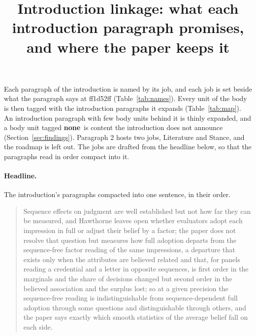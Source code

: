 \documentclass[11pt,a4paper]{article}
\title{Introduction linkage: what each introduction paragraph promises,\\ and where the paper keeps it}
\author{}
\date{}
\newcommand{\none}{\textbf{none}}
\begin{document}
\maketitle

\noindent Each paragraph of the introduction is named by its job, and each job is set beside
what the paragraph says at ff1d52ff (Table~\ref{tab:names}). Every unit of the body is then
tagged with the introduction paragraphs it expands (Table~\ref{tab:map}). An introduction
paragraph with few body units behind it is thinly expanded, and a body unit tagged \none\ is
content the introduction does not announce (Section~\ref{sec:findings}). Paragraph 2 hosts two
jobs, Literature and Stance, and the roadmap is left out. The jobs are drafted from the headline
below, so that the paragraphs read in order compact into it.

\paragraph{Headline.} The introduction's paragraphs compacted into one sentence, in their order.
\begin{quote}
Sequence effects on judgment are well established but not how far they can be measured, and
Hawthorne leaves open whether evaluators adopt each impression in full or adjust their belief by
a factor; the paper does not resolve that question but measures how full adoption departs from
the sequence-free factor reading of the same impressions, a departure that exists only when the
attributes are believed related and that, for panels reading a credential and a letter in
opposite sequences, is first order in the marginals and the share of decisions changed but
second order in the believed association and the surplus lost; so at a given precision the
sequence-free reading is indistinguishable from sequence-dependent full adoption through some
questions and distinguishable through others, and the paper says exactly which smooth
statistics of the average belief fall on each side.
\end{quote}
\end{document}
